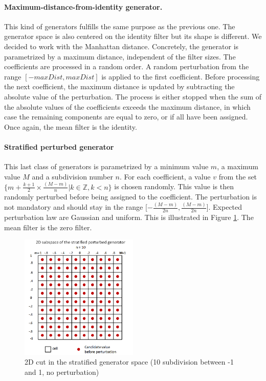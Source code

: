 \documentclass[a4paper]{report}
\begin{document}
			\paragraph{Maximum-distance-from-identity generator.} 
			This kind of generators fulfills the same purpose as the previous one. The generator space is also centered on the identity filter but its shape is different. We decided to work with the Manhattan distance. Concretely, the generator is parametrized by a maximum distance, independent of the filter sizes. The coefficients are processed in a random order. A random perturbation from the range $[-maxDist, maxDist]$ is applied to the first coefficient. Before processing the next coefficient, the maximum distance is updated by subtracting the absolute value of the perturbation. The process is either stopped when the sum of the absolute values of the coefficients exceeds the maximum distance, in which case the remaining components are equal to zero, or if all have been assigned.
			Once again, the mean filter is the identity.
			
			\paragraph{Stratified perturbed generator}
			This last class of generators is parametrized by a minimum value $m$, a maximum value $M$ and a subdivision number $n$. For each coefficient, a value $v$ from the set $\{m + \frac{k+1}{2} \times \frac{(M-m)}{n} | k \in \mathbb{Z}, k < n\}$ is chosen randomly.  This value is then randomly perturbed before being assigned to the coefficient. The perturbation is not mandatory and should stay in the range [$-\frac{(M-m)}{2n}, \frac{(M-m)}{2n}$]. Expected perturbation law are Gaussian and uniform. This is illustrated in Figure \ref{fig:stratgen}. The mean filter is the zero filter.
			\begin{figure}
				\centering
					\includegraphics[width=0.5\textwidth]{images/stratgen.png}
				\caption{\label{fig:stratgen}2D cut in the stratified generator space (10 subdivision between -1 and 1, no perturbation)}
			\end{figure}
			
\end{document}
